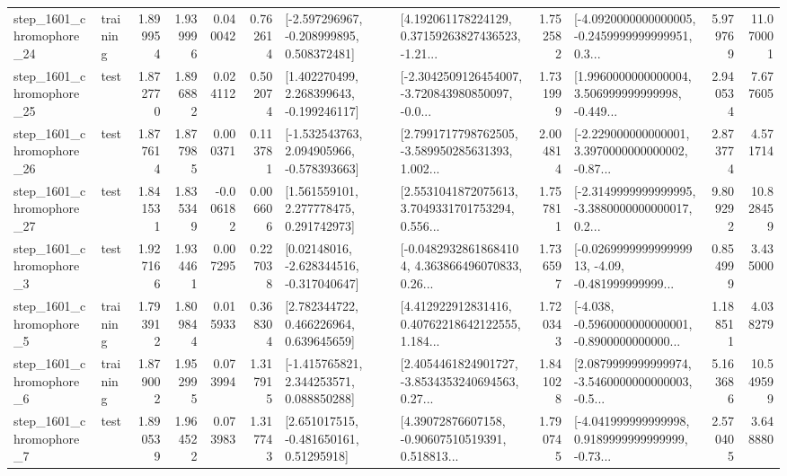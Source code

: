 \begin{tabular}{llrrrrllrlrr}
 step\_1601\_chromophore\_24 &  training &      1.899954 &    1.939996 &      0.040042 &  0.762614 &   [-2.597296967, -0.208999895, 0.508372481] &  [4.192061178224129, 0.37159263827436523, -1.21... &       1.752582 &  [-4.0920000000000005, -0.2459999999999951, 0.3... &            5.979769 &         11.070001 \\
 step\_1601\_chromophore\_25 &      test &      1.872770 &    1.896882 &      0.024112 &  0.502074 &    [1.402270499, 2.268399643, -0.199246117] &  [-2.3042509126454007, -3.720843980850097, -0.0... &       1.731999 &  [1.9960000000000004, 3.506999999999998, -0.449... &            2.940534 &          7.677605 \\
 step\_1601\_chromophore\_26 &      test &      1.877614 &    1.877985 &      0.000371 &  0.113781 &   [-1.532543763, 2.094905966, -0.578393663] &  [2.7991717798762505, -3.589950285631393, 1.002... &       2.004814 &  [-2.229000000000001, 3.3970000000000002, -0.87... &            2.873774 &          4.571714 \\
 step\_1601\_chromophore\_27 &      test &      1.841531 &    1.835349 &     -0.006182 &  0.006606 &     [1.561559101, 2.277778475, 0.291742973] &  [2.5531041872075613, 3.7049331701753294, 0.556... &       1.757811 &  [-2.3149999999999995, -3.3880000000000017, 0.2... &            9.809292 &         10.828459 \\
  step\_1601\_chromophore\_3 &      test &      1.927166 &    1.934461 &      0.007295 &  0.227038 &    [0.02148016, -2.628344516, -0.317040647] &  [-0.04829328618684104, 4.363866496070833, 0.26... &       1.736597 &  [-0.026999999999999913, -4.09, -0.481999999999... &            0.854999 &          3.435000 \\
  step\_1601\_chromophore\_5 &  training &      1.793912 &    1.809844 &      0.015933 &  0.368304 &     [2.782344722, 0.466226964, 0.639645659] &  [4.412922912831416, 0.40762218642122555, 1.184... &       1.720343 &  [-4.038, -0.5960000000000001, -0.8900000000000... &            1.188511 &          4.038279 \\
  step\_1601\_chromophore\_6 &  training &      1.879002 &    1.952995 &      0.073994 &  1.317915 &    [-1.415765821, 2.344253571, 0.088850288] &  [2.4054461824901727, -3.8534353240694563, 0.27... &       1.841028 &  [2.0879999999999974, -3.5460000000000003, -0.5... &            5.163686 &         10.549599 \\
  step\_1601\_chromophore\_7 &      test &      1.890539 &    1.964522 &      0.073983 &  1.317743 &     [2.651017515, -0.481650161, 0.51295918] &  [4.39072876607158, -0.90607510519391, 0.518813... &       1.790745 &  [-4.041999999999998, 0.9189999999999999, -0.73... &            2.570405 &          3.648880 \\

\end{tabular}
